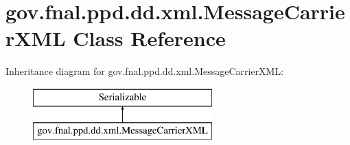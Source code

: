 \hypertarget{classgov_1_1fnal_1_1ppd_1_1dd_1_1xml_1_1MessageCarrierXML}{\section{gov.\-fnal.\-ppd.\-dd.\-xml.\-Message\-Carrier\-X\-M\-L Class Reference}
\label{classgov_1_1fnal_1_1ppd_1_1dd_1_1xml_1_1MessageCarrierXML}
}
Inheritance diagram for gov.\-fnal.\-ppd.\-dd.\-xml.\-Message\-Carrier\-X\-M\-L\-:\begin{figure}[H]
\begin{center}
\leavevmode
\includegraphics[height=2.000000cm]{classgov_1_1fnal_1_1ppd_1_1dd_1_1xml_1_1MessageCarrierXML}
\end{center}
\end{figure}
